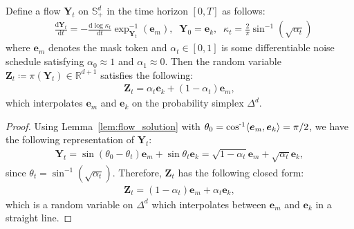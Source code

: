 \begin{tcolorbox}
[colback=white,colframe=blue!30!white]
\begin{proposition}
\label{prop:uniform_flow}
Define a flow $\bm{Y}_t$ on $\mathbb{S}^d_{+}$ in the time horizon $[0,T]$ as follows:
\begin{align}
    &\frac{\mathrm{d}\bm{Y}_t}{\mathrm{d}t} = -\frac{\mathrm{d}\log \kappa_t}{\mathrm{d}t}
    \exp^{-1}_{\bm{Y}_t}(\bm{e}_m), \;\; \bm{Y}_0=\bm{e}_k, \;\;
    \kappa_t = \frac{2}{\pi}\sin^{-1}\!\left( \sqrt{\alpha_t} \right)
\label{eq:mask_flow}
\end{align}
where $\bm{e}_m$ denotes the mask token and $\alpha_t\in[0,1]$ is some differentiable noise schedule satisfying $\alpha_0\approx1$ and $\alpha_1\approx0$.
Then the random variable $\bm{Z}_t\coloneqq \pi\left(\bm{Y}_t \right) \in\mathbb{R}^{d+1}$ satisfies the following:
\begin{align}
     \bm{Z}_t = \alpha_t\bm{e}_k + (1-\alpha_t)\bm{e}_m,
\label{eq:mask_simplex}
\end{align}
which interpolates $\bm{e}_m$ and $\bm{e}_k$ on the probability simplex $\Delta^{d}$.
\end{proposition}
\end{tcolorbox}

\begin{proof}
Using Lemma~\ref{lem:flow_solution} with $\theta_0 = \invcos \langle \bm{e}_m,\bm{e}_k \rangle=\pi/2$, we have the following representation of $\bm{Y}_t$:
\begin{align}
    \bm{Y}_t = \sin(\theta_0 - \theta_t)\bm{e}_m + \sin\theta_t\bm{e}_k 
    = \sqrt{1-\alpha_t}\bm{e}_m + \sqrt{\alpha_t}\bm{e}_k ,
\end{align}
since $\theta_t = \sin^{-1}\!(\sqrt{\alpha_t})$.
Therefore, $\bm{Z}_t$ has the following closed form:
\begin{align}
    \bm{Z}_t = ({1-\alpha_t})\bm{e}_m + {\alpha_t}\bm{e}_k,
\end{align}
which is a random variable on $\Delta^d$ which interpolates between $\bm{e}_m$ and $\bm{e}_k$ in a straight line.
\end{proof}


